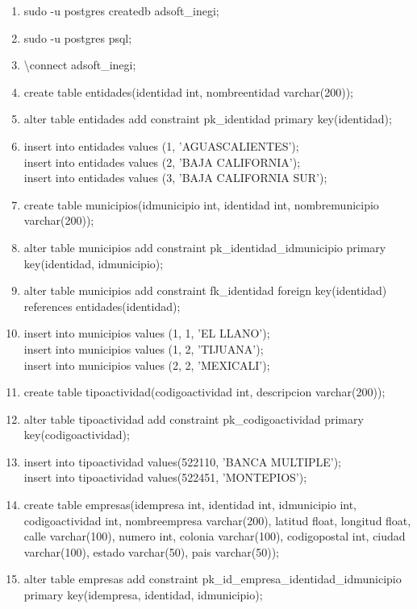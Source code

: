 \documentclass[10pt]{article}         %
\begin{document}
\begin{enumerate}

\item
	sudo -u postgres createdb adsoft\_inegi;
\item
	sudo -u postgres psql;
\item
	\textbackslash connect adsoft\_inegi;
\item
	create table entidades(identidad int, nombreentidad varchar(200));
\item
	alter table entidades add constraint pk\_identidad primary key(identidad);
\item
	insert into entidades values (1, 'AGUASCALIENTES'); \\
	insert into entidades values (2, 'BAJA CALIFORNIA'); \\
	insert into entidades values (3, 'BAJA CALIFORNIA SUR');
\item
	create table municipios(idmunicipio int, identidad int, nombremunicipio varchar(200));	
\item
	alter table municipios add constraint pk\_identidad\_idmunicipio primary key(identidad, idmunicipio);
\item
    alter table municipios add constraint fk\_identidad foreign key(identidad) references entidades(identidad);
\item
	insert into municipios values (1, 1, 'EL LLANO'); \\
	insert into municipios values (1, 2, 'TIJUANA'); \\
	insert into municipios values (2, 2, 'MEXICALI');
\item
	create table tipoactividad(codigoactividad int, descripcion varchar(200));
\item
	alter table tipoactividad add constraint pk\_codigoactividad primary key(codigoactividad);
\item
	insert into tipoactividad values(522110, 'BANCA MULTIPLE'); \\
	insert into tipoactividad values(522451, 'MONTEPIOS');
\item
	create table empresas(idempresa int, identidad int, idmunicipio int, codigoactividad int, nombreempresa varchar(200),   latitud float, longitud float, calle varchar(100), numero int, colonia varchar(100), codigopostal int, ciudad	 varchar(100), estado varchar(50), pais varchar(50));
\item
	alter table empresas add constraint pk\_id\_empresa\_identidad\_idmunicipio primary key(idempresa, identidad, idmunicipio);


\end{enumerate}
\end{document}
